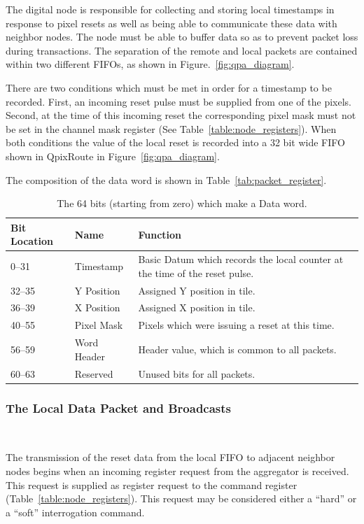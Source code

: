 The digital node is responsible for collecting and storing local timestamps in response to pixel resets as well as being able to communicate these data with neighbor nodes.
The node must be able to buffer data so as to prevent packet loss during transactions.
The separation of the remote and local packets are contained within two different FIFOs, as shown in Figure.~\ref{fig:qpa_diagram}.

There are two conditions which must be met in order for a timestamp to be recorded.
First, an incoming reset pulse must be supplied from one of the pixels.
Second, at the time of this incoming reset the corresponding pixel mask must not be set in the channel mask register (See Table~\ref{table:node_registers}).
When both conditions the value of the local reset is recorded into a 32 bit wide FIFO shown in QpixRoute in Figure~\ref{fig:qpa_diagram}.

The composition of the data word is shown in Table~\ref{tab:packet_register}.
\begin{table}
\begin{center}
\begin{tabular}{|| p{30mm} | p{30mm} | p{90mm} ||}
 \hline
 Bit Location & Name & Function \\ [0.5ex]
 \hline\hline
  0--31 & Timestamp & Basic Datum which records the local counter at the time of the reset pulse. \\
 \hline
  32--35 & Y Position & Assigned Y position in tile. \\
 \hline
  36--39 & X Position & Assigned X position in tile. \\
 \hline
  40--55 & Pixel Mask & Pixels which were issuing a reset at this time. \\
 \hline
  56--59 & Word Header & Header value, which is common to all packets. \\
 \hline
  60--63 & Reserved & Unused bits for all packets. \\
 \hline
\end{tabular}
\caption{The 64 bits (starting from zero) which make a Data word.}
\label{tab:packet_data}
\end{center}
\end{table}

\subsubsection{The Local Data Packet and Broadcasts}~\label{sec:local_data_packet}

The transmission of the reset data from the local FIFO to adjacent neighbor nodes begins when an incoming register request from the aggregator is received.
This request is supplied as register request to the command register (Table~\ref{table:node_registers}).
This request may be considered either a ``hard'' or a ``soft'' interrogation command.

